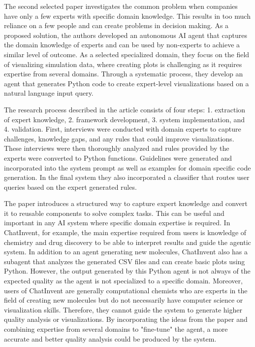 \documentclass[11pt]{article}
\begin{document}
The second selected paper \cite{kulyabin2026build} investigates the common problem when companies have only a few experts with specific domain knowledge. This results in too much reliance on a few people and can create problems in decision making. As a proposed solution, the authors developed an autonomous AI agent that captures the domain knowledge of experts and can be used by non-experts to achieve a similar level of outcome.
As a selected specialized domain, they focus on the field of visualizing simulation data, where creating plots is challenging as it requires expertise from several domains. Through a systematic process, they develop an agent that generates Python code to create expert-level visualizations based on a natural language input query.

The research process described in the article consists of four steps: 1. extraction of expert knowledge, 2. framework development, 3. system implementation, and 4. validation. First, interviews were conducted with domain experts to capture challenges, knowledge gaps, and any rules that could improve visualizations. These interviews were then thoroughly analyzed and rules provided by the experts were converted to Python functions. Guidelines were generated and incorporated into the system prompt as well as examples for domain specific code generation. In the final system they also incorporated a classifier that routes user queries based on the expert generated rules.

The paper introduces a structured way to capture expert knowledge and convert it to reusable components to solve complex tasks. This can be useful and important in any AI system where specific domain expertise is required. In ChatInvent, for example, the main expertise required from users is knowledge of chemistry and drug discovery to be able to interpret results and guide the agentic system. In addition to an agent generating new molecules, ChatInvent also has a subagent that analyzes the generated CSV files and can create basic plots using Python. However, the output generated by this Python agent is not always of the expected quality as the agent is not specialized to a specific domain. Moreover, users of ChatInvent are generally computational chemists who are experts in the field of creating new molecules but do not necessarily have computer science or visualization skills. Therefore, they cannot guide the system to generate higher quality analysis or visualizations. By incorporating the ideas from the paper and combining expertise from several domains to "fine-tune" the agent, a more accurate and better quality analysis could be produced by the system. 
\end{document}
